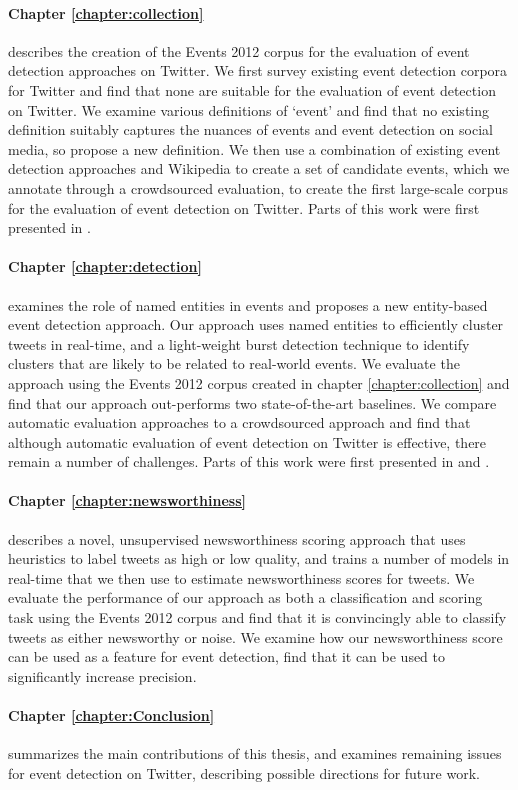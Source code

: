 \vspace{-0.5cm}
\paragraph{Chapter \ref{chapter:collection}} describes the creation of the Events 2012 corpus for the evaluation of event detection approaches on Twitter. We first survey existing event detection corpora for Twitter and find that none are suitable for the evaluation of event detection on Twitter.
We examine various definitions of `event' and find that no existing definition suitably captures the nuances of events and event detection on social media, so propose a new definition.
We then use a combination of existing event detection approaches and Wikipedia to create a set of candidate events, which we annotate through a crowdsourced evaluation, to create the first large-scale corpus for the evaluation of event detection on Twitter. Parts of this work were first presented in \cite{McMinn2013}.

\vspace{-0.5cm}
\paragraph{Chapter \ref{chapter:detection}} examines the role of named entities in events and proposes a new entity-based event detection approach.
Our approach uses named entities to efficiently cluster tweets in real-time, and a light-weight burst detection technique to identify clusters that are likely to be related to real-world events.
We evaluate the approach using the Events 2012 corpus created in chapter \ref{chapter:collection} and find that our approach out-performs two state-of-the-art baselines.
We compare automatic evaluation approaches to a crowdsourced approach and find that although automatic evaluation of event detection on Twitter is effective, there remain a number of challenges.
Parts of this work were first presented in \cite{McMinn14} and \cite{McMinn15}.

\vspace{-0.5cm}
\paragraph{Chapter \ref{chapter:newsworthiness}} describes a novel, unsupervised newsworthiness scoring approach that uses heuristics to label tweets as high or low quality, and trains a number of models in real-time that we then use to estimate newsworthiness scores for tweets.
We evaluate the performance of our approach as both a classification and scoring task using the Events 2012 corpus and find that it is convincingly able to classify tweets as either newsworthy or noise.
We examine how our newsworthiness score can be used as a feature for event detection, find that it can be used to significantly increase precision.

\vspace{-0.5cm}
\paragraph{Chapter \ref{chapter:Conclusion}} summarizes the main contributions of this thesis, and examines remaining issues for event detection on Twitter, describing possible directions for future work.


\newpage
